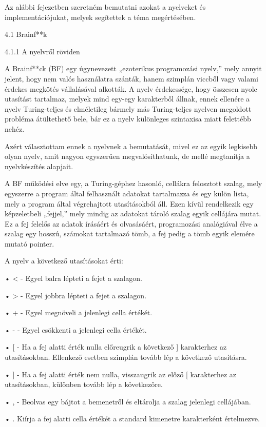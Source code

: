Az alábbi fejezetben szeretném bemutatni azokat a nyelveket és implementációjukat, melyek segítettek a téma megértésében.

4.1 Brainf**k

4.1.1 A nyelvről röviden

A Brainf**ck (BF) egy úgynevezett „ezoterikus programozási nyelv,” mely annyit jelent, hogy nem valós használatra szánták, hanem szimplán viccből vagy valami érdekes megkötés vállalásával alkották. A nyelv érdekessége, hogy összesen nyolc utasítást tartalmaz, melyek mind egy-egy karakterből állnak, ennek ellenére a nyelv Turing-teljes és elméletileg bármely más Turing-teljes nyelven megoldott probléma átültethető bele, bár ez a nyelv különleges szintaxisa miatt felettébb nehéz.

Azért választottam ennek a nyelvnek a bemutatását, mivel ez az egyik legkisebb olyan nyelv, amit nagyon egyszerűen megvalósíthatunk, de mellé megtanítja a nyelvkészítés alapjait.

A BF működési elve egy, a Turing-géphez hasonló, cellákra felosztott szalag, mely egyszerre a program által felhasznált adatokat tartalmazza és egy külön lista, mely a program által végrehajtott utasításokból áll. Ezen kívül rendelkezik egy képzeletbeli „fejjel,” mely mindig az adatokat tároló szalag egyik cellájára mutat. Ez a fej felelős az adatok írásáért és olvasásáért, programozási analógiával élve a szalag egy hosszú, számokat tartalmazó tömb, a fej pedig a tömb egyik elemére mutató pointer.

A nyelv a következő utasításokat érti:

    • < - Egyel balra lépteti a fejet a szalagon.

    • > - Egyel jobbra lépteti a fejet a szalagon.

    • + - Egyel megnöveli a jelenlegi cella értékét.

    • - - Egyel csökkenti a jelenlegi cella értékét.

    • [ - Ha a fej alatti érték nulla előreugrik a következő ] karakterhez az utasításokban. Ellenkező esetben szimplán tovább lép a következő utasításra.

    • ] - Ha a fej alatti érték nem nulla, visszaugrik az előző [ karakterhez az utasításokban, különben tovább lép a következőre.

    • , - Beolvas egy bájtot a bemenetről és eltárolja a szalag jelenlegi cellájában.

    • .  Kiírja a fej alatti cella értékét a standard kimenetre karakterként értelmezve.


